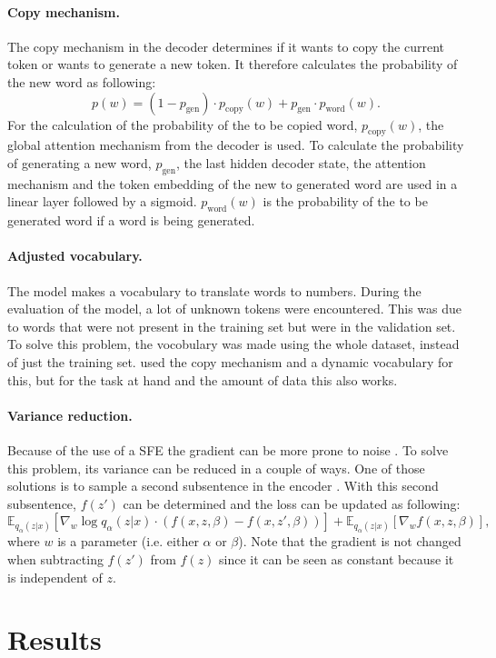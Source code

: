 \paragraph{Copy mechanism.} The copy mechanism  in the decoder determines if it wants to copy the current token or wants to generate a new token. 
It therefore calculates the probability of the new word as following:
\begin{equation}
    p(w) = (1 - p_{\text{gen}}) \cdot p_{\text{copy}}(w) + p_{\text{gen}} \cdot p_{\text{word}}(w).
\end{equation}
For the calculation of the probability of the to be copied word, $p_{\text{copy}}(w)$, the global attention mechanism from the decoder is used. 
To calculate the probability of generating a new word, $p_{\text{gen}}$, the last hidden decoder state, the attention mechanism and the token embedding of the new to generated word are used in a linear layer followed by a sigmoid.
$p_{\text{word}}(w)$ is the probability of the to be generated word if a word is being generated. 

\paragraph{Adjusted vocabulary.} The model makes a vocabulary to translate words to numbers. 
During the evaluation of the model, a lot of unknown tokens were encountered.
This was due to words that were not present in the training set but were in the validation set. 
To solve this problem, the vocobulary was made using the whole dataset, instead of just the training set. 
 used the copy mechanism and a dynamic vocabulary for this, but for the task at hand and the amount of data this also works.

\paragraph{Variance reduction.} Because of the use of a SFE the gradient can be more prone to noise .
To solve this problem, its variance can be reduced in a couple of ways. 
One of those solutions is to sample a second subsentence in the encoder . 
With this second subsentence, $f(z')$ can be determined and the loss can be updated as following:
\begin{equation}
    \mathbb{E}_{q_{\alpha}(z|x)} [\nabla_w \log q_{\alpha}(z|x) \cdot (f(x, z, \beta)-f(x, z', \beta))] + \mathbb{E}_{q_{\alpha}(z|x)} [\nabla_w f(x, z, \beta)],
\end{equation}
where $w$ is a parameter (i.e. either $\alpha$ or $\beta$). Note that the gradient is not changed when subtracting $f(z')$ from $f(z)$ since it can be seen as constant because it is independent of $z$.

\section{Results}
